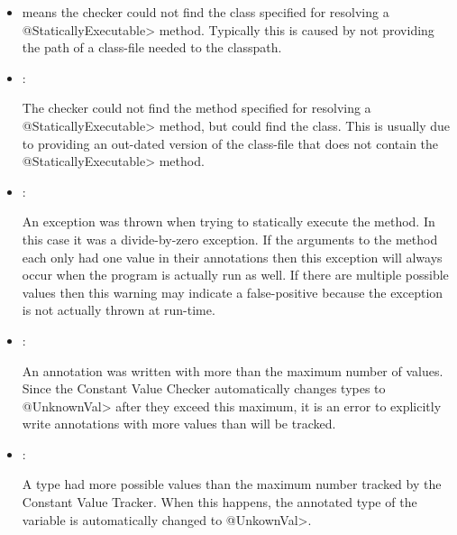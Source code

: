 \begin{itemize}
\item {}  means the checker could not find the class
  specified for resolving a \<@StaticallyExecutable> method. Typically
  this is caused by not providing the path of a class-file needed to
  the classpath.
\item {}: 

  The checker could not find the method  specified for
  resolving a \<@StaticallyExecutable> method, but could find the
  class. This is usually due to providing an out-dated version of the
  class-file that does not contain the \<@StaticallyExecutable>
  method.
\item {}: 

  An exception was thrown when trying to statically execute the
  method. In this case it was a divide-by-zero exception. If the
  arguments to the method each only had one value in their annotations
  then this exception will always occur when the program is actually
  run as well. If there are multiple possible values then this warning
  may indicate a false-positive because the exception is not actually
  thrown at run-time.
\item {}:  

  An annotation was written with more than the maximum number of
  values. Since the Constant Value Checker automatically changes types
  to \<@UnknownVal> after they exceed this maximum, it is an error to
  explicitly write annotations with more values than will be tracked.
\item {}:

  A type had more possible values than the maximum number tracked by
  the Constant Value Tracker. When this happens, the annotated type of
  the variable is automatically changed to \<@UnkownVal>.

 

\end{itemize}


